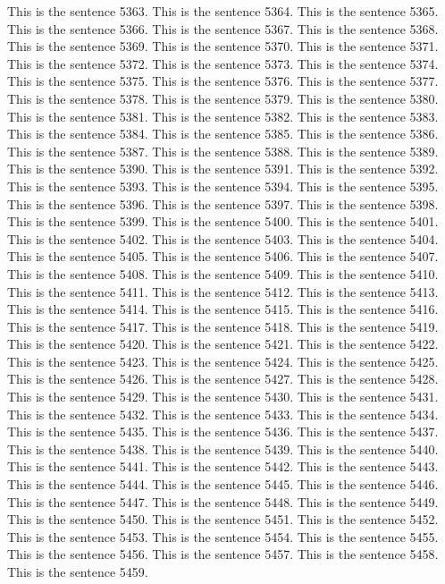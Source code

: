 \documentclass{article}
\begin{document}
This is the sentence 5363.
This is the sentence 5364.
This is the sentence 5365.
This is the sentence 5366.
This is the sentence 5367.
This is the sentence 5368.
This is the sentence 5369.
This is the sentence 5370.
This is the sentence 5371.
This is the sentence 5372.
This is the sentence 5373.
This is the sentence 5374.
This is the sentence 5375.
This is the sentence 5376.
This is the sentence 5377.
This is the sentence 5378.
This is the sentence 5379.
This is the sentence 5380.
This is the sentence 5381.
This is the sentence 5382.
This is the sentence 5383.
This is the sentence 5384.
This is the sentence 5385.
This is the sentence 5386.
This is the sentence 5387.
This is the sentence 5388.
This is the sentence 5389.
This is the sentence 5390.
This is the sentence 5391.
This is the sentence 5392.
This is the sentence 5393.
This is the sentence 5394.
This is the sentence 5395.
This is the sentence 5396.
This is the sentence 5397.
This is the sentence 5398.
This is the sentence 5399.
This is the sentence 5400.
This is the sentence 5401.
This is the sentence 5402.
This is the sentence 5403.
This is the sentence 5404.
This is the sentence 5405.
This is the sentence 5406.
This is the sentence 5407.
This is the sentence 5408.
This is the sentence 5409.
This is the sentence 5410.
This is the sentence 5411.
This is the sentence 5412.
This is the sentence 5413.
This is the sentence 5414.
This is the sentence 5415.
This is the sentence 5416.
This is the sentence 5417.
This is the sentence 5418.
This is the sentence 5419.
This is the sentence 5420.
This is the sentence 5421.
This is the sentence 5422.
This is the sentence 5423.
This is the sentence 5424.
This is the sentence 5425.
This is the sentence 5426.
This is the sentence 5427.
This is the sentence 5428.
This is the sentence 5429.
This is the sentence 5430.
This is the sentence 5431.
This is the sentence 5432.
This is the sentence 5433.
This is the sentence 5434.
This is the sentence 5435.
This is the sentence 5436.
This is the sentence 5437.
This is the sentence 5438.
This is the sentence 5439.
This is the sentence 5440.
This is the sentence 5441.
This is the sentence 5442.
This is the sentence 5443.
This is the sentence 5444.
This is the sentence 5445.
This is the sentence 5446.
This is the sentence 5447.
This is the sentence 5448.
This is the sentence 5449.
This is the sentence 5450.
This is the sentence 5451.
This is the sentence 5452.
This is the sentence 5453.
This is the sentence 5454.
This is the sentence 5455.
This is the sentence 5456.
This is the sentence 5457.
This is the sentence 5458.
This is the sentence 5459.
\end{document}
